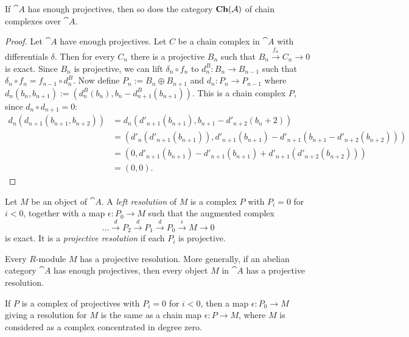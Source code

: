 \begin{exercise}
	If $\cat{A}$ has enough projectives, then so does the category $\textrm{\textup{\textbf{Ch}}}(\mathcal{A})$ of chain complexes over $\cat{A}$.
\end{exercise}

\begin{proof}
	Let $\cat{A}$ have enough projectives.
	Let $C$ be a chain complex in $\cat{A}$ with differentials $\delta$.
	Then for every $C_n$ there is a projective $B_n$ such that $B_n \overset{f_n}{\longrightarrow} C_n \rightarrow 0$ is exact.
	Since $B_n$ is projective, we can lift $\delta_n\circ f_n$ to $d^B_n: B_n \rightarrow B_{n-1}$ such that $\delta_n\circ f_n = f_{n-1}\circ d^B_n$. 
	Now define $P_n := B_n \oplus B_{n+1}$ and $d_n: P_n \rightarrow P_{n-1}$ where $d_n(b_n,b_{n+1}) := (d^B_n(b_n), b_n - d^B_{n+1}(b_{n+1}))$.
	This is a chain complex $P$, since $d_n \circ d_{n+1} = 0$:
	\begin{align*}
		d_n( d_{n+1}( b_{n+1}, b_{n+2} ) )
		&= d_n( d'_{n+1}(b_{n+1}), b_{n+1} - d'_{n+2}({b_n+2})) \\
		&= (d'_n(d'_{n+1}(b_{n+1})), d'_{n+1}(b_{n+1}) - d'_{n+1}(b_{n+1} - d'_{n+2}(b_{n+2}))) \\
		&= (0, d'_{n+1}(b_{n+1}) - d'_{n+1}(b_{n+1}) + d'_{n+1}(d'_{n+2}(b_{n+2}))) \\
		&= (0, 0).
	\end{align*}
	
\end{proof}

\begin{definition}
	Let $M$ be an object of $\cat{A}$. A \textit{left resolution} of $M$ is a complex $P$ with $P_i=0$ for $i<0$, together with a map $\epsilon:P_0\rightarrow M$ such that the augmented complex
	$$\dots \overset{d}{\longrightarrow} P_2 \overset{d}{\longrightarrow} P_1 \overset{d}{\longrightarrow} P_0 \overset{\epsilon}{\longrightarrow} M \longrightarrow 0$$
	is exact. It is a \textit{projective resolution} if each $P_i$ is projective.
\end{definition}

\begin{lemma}
	Every $R$-module $M$ has a projective resolution. More generally, if an abelian category $\cat{A}$ has enough projectives, then every object $M$ in $\cat{A}$ has a projective resolution.
\end{lemma}

\begin{exercise}
	If $P$ is a complex of projectives with $P_i=0$ for $i<0$, then a map $\epsilon:P_0\rightarrow M$ giving a resolution for $M$ is the same as a chain map $\epsilon:P\rightarrow M$, where $M$ is considered as a complex concentrated in degree zero.
\end{exercise}

